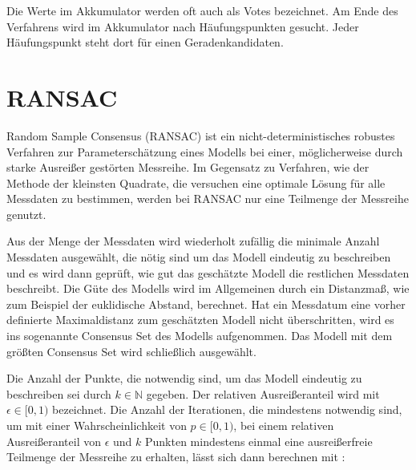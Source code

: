 Die Werte im Akkumulator werden oft auch als Votes bezeichnet. Am Ende des Verfahrens wird im Akkumulator nach Häufungspunkten gesucht. Jeder Häufungspunkt steht dort für einen Geradenkandidaten.




\section{RANSAC}
\label{s:ransac}
Random Sample Consensus (RANSAC) \cite{Fischler1981} ist ein nicht-deterministisches robustes Verfahren zur Parameterschätzung eines Modells bei einer, möglicherweise durch starke Ausreißer gestörten Messreihe.
Im Gegensatz zu Verfahren, wie der Methode der kleinsten Quadrate, die versuchen eine optimale Lösung für alle Messdaten zu bestimmen, werden bei RANSAC nur eine Teilmenge der Messreihe genutzt.

Aus der Menge der Messdaten wird wiederholt zufällig die minimale Anzahl Messdaten ausgewählt, die nötig sind um das Modell eindeutig zu beschreiben und es wird dann geprüft, wie gut das geschätzte Modell die restlichen Messdaten beschreibt.
Die Güte des Modells wird im Allgemeinen durch ein Distanzmaß, wie zum Beispiel der euklidische Abstand, berechnet.
Hat ein Messdatum eine vorher definierte Maximaldistanz zum geschätzten Modell nicht überschritten, wird es ins sogenannte Consensus Set des Modells aufgenommen.
Das Modell mit dem größten Consensus Set wird schließlich ausgewählt.

Die Anzahl der Punkte, die notwendig sind, um das Modell eindeutig zu beschreiben sei durch $k\in\mathbb{N}$ gegeben. Der relativen Ausreißeranteil wird mit $\epsilon \in[0,1)$ bezeichnet. 
Die Anzahl der Iterationen, die mindestens notwendig sind, um mit einer Wahrscheinlichkeit von $p \in [0,1)$, bei einem relativen Ausreißeranteil von $\epsilon$ und $k$ Punkten mindestens einmal eine ausreißerfreie Teilmenge der Messreihe zu erhalten, lässt sich dann berechnen mit \cite{Fischler1981}:

